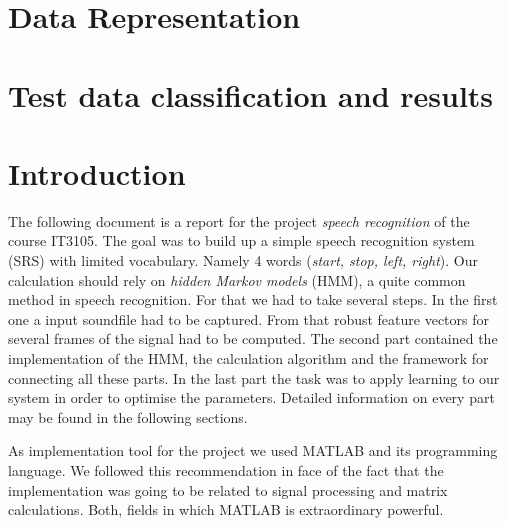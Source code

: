\documentclass[titlepage]{article}
\begin{document}
\section{Data Representation}
  
\section{Test data classification and results}




\section{Introduction}
The following document is a report for the project \emph{speech recognition} of the course IT3105. The goal was to build up a simple speech recognition system (SRS) with limited vocabulary. Namely 4 words (\emph{start, stop, left, right}). Our calculation should rely on \emph{hidden Markov models} (HMM), a quite common method in speech recognition. For that we had to take several steps. In the first one a input soundfile had to be captured. From that robust feature vectors for several frames of the signal had to be computed. The second part contained the implementation of the HMM, the calculation algorithm and the framework for connecting all these parts. In the last part the task was to apply learning to our system in order to optimise the parameters. Detailed information on every part may be found in the following sections.

As implementation tool for the project we used MATLAB and its programming language. We followed this recommendation in face of the fact that the implementation was going to be related to signal processing and matrix calculations. Both, fields in which MATLAB is extraordinary powerful.
\end{document}
